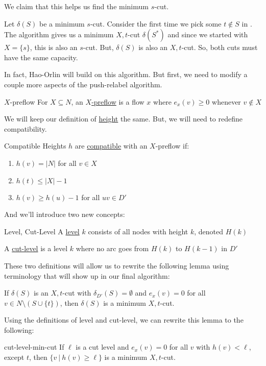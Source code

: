 We claim that this helps us find the minimum $s$-cut.

Let $\delta(S)$ be a minimum $s$-cut.
Consider the first time we pick some $t \not\in S$ in .
The algorithm gives us a minimum $X,t$-cut $\delta(S^*)$ and since we started with $X = \{s\}$, this is also an $s$-cut.
But, $\delta(S)$ is also an $X,t$-cut.
So, both cuts must have the same capacity.

In fact, Hao-Orlin will build on this algorithm.
But first, we need to modify a couple more aspects of the push-relabel algorithm.

\begin{definition}{$X$-preflow}{}
    For $X \subseteq N$, an \underline{$X$-preflow} is a flow $x$ where $e_x(v) \geq 0$ whenever $v \not\in X$
\end{definition}

We will keep our definition of \underline{height} the same.
But, we will need to redefine compatibility.

\begin{definition}{Compatible}{}
    Heights $h$ are \underline{compatible} with an $X$-preflow if:
    \begin{enumerate}
        \item $h(v) = |N|$ for all $v \in X$
        \item $h(t) \leq |X| - 1$
        \item $h(v) \geq h(u) - 1$ for all $uv \in D'$
    \end{enumerate}
\end{definition}

And we'll introduce two new concepts:
\begin{definition}{Level, Cut-Level}{}
    A \underline{level} $k$ consists of all nodes with height $k$, denoted $H(k)$

    A \underline{cut-level} is a level $k$ where no arc goes from $H(k)$ to $H(k-1)$ in $D'$
\end{definition}

These two definitions will allow us to rewrite the following lemma using terminology that will show up in our final algorithm:

\begin{lemma}{}{}
    If $\delta(S)$ is an $X,t$-cut with $\delta_{D'}(S) = \emptyset$ and $e_x(v) = 0$ for all $v \in N\setminus(S \cup \{t\})$, then $\delta(S)$ is a minimum $X,t$-cut.
\end{lemma}

Using the definitions of level and cut-level, we can rewrite this lemma to the following:
\begin{corollary}{}{cut-level-min-cut}
    If $\ell$ is a cut level and $e_x(v) = 0$ for all $v$ with $h(v) < \ell$, except $t$, then $\{v\:|\:h(v) \geq \ell\}$ is a minimum $X,t$-cut.
\end{corollary}

